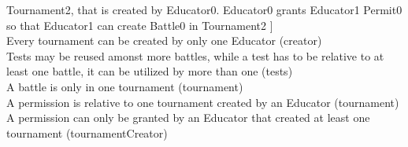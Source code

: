 \documentclass{article}
\begin{document}
{Tournament2, that is created by Educator0. Educator0 grants Educator1 Permit0 so that Educator1 can create Battle0 in Tournament2 ]\\
\color{green}
Every tournament can be created by only one Educator (creator)\\
\color{blue}
Tests may be reused amonst more battles, while a test has to be relative to at least one battle, it can be utilized by more than one (tests)\\
\color{violet}
A battle is only in one tournament (tournament)\\
\color{red}
A permission is relative to one tournament created by an Educator (tournament)\\
\color{brown}
A permission can only be granted by an Educator that created at least one tournament (tournamentCreator)\\
\color{black}

\pagestyle{EffortSpentStyle}

}
\end{document}

